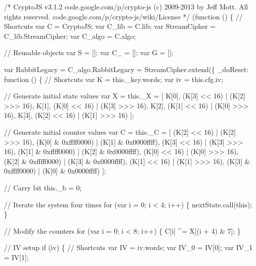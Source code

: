\begin{DoxyCodeInclude}
\textcolor{comment}{/*}
\textcolor{comment}{CryptoJS v3.1.2}
\textcolor{comment}{code.google.com/p/crypto-js}
\textcolor{comment}{(c) 2009-2013 by Jeff Mott. All rights reserved.}
\textcolor{comment}{code.google.com/p/crypto-js/wiki/License}
\textcolor{comment}{*/}
(\textcolor{keyword}{function} () \{
    \textcolor{comment}{// Shortcuts}
    var C = CryptoJS;
    var C\_lib = C.lib;
    var StreamCipher = C\_lib.StreamCipher;
    var C\_algo = C.algo;

    \textcolor{comment}{// Reusable objects}
    var S  = [];
    var C\_ = [];
    var G  = [];

    var RabbitLegacy = C\_algo.RabbitLegacy = StreamCipher.extend(\{
        \_doReset: \textcolor{keyword}{function} () \{
            \textcolor{comment}{// Shortcuts}
            var K = this.\_key.words;
            var iv = this.cfg.iv;

            \textcolor{comment}{// Generate initial state values}
            var X = this.\_X = [
                K[0], (K[3] << 16) | (K[2] >>> 16),
                K[1], (K[0] << 16) | (K[3] >>> 16),
                K[2], (K[1] << 16) | (K[0] >>> 16),
                K[3], (K[2] << 16) | (K[1] >>> 16)
            ];

            \textcolor{comment}{// Generate initial counter values}
            var C = this.\_C = [
                (K[2] << 16) | (K[2] >>> 16), (K[0] & 0xffff0000) | (K[1] & 0x0000ffff),
                (K[3] << 16) | (K[3] >>> 16), (K[1] & 0xffff0000) | (K[2] & 0x0000ffff),
                (K[0] << 16) | (K[0] >>> 16), (K[2] & 0xffff0000) | (K[3] & 0x0000ffff),
                (K[1] << 16) | (K[1] >>> 16), (K[3] & 0xffff0000) | (K[0] & 0x0000ffff)
            ];

            \textcolor{comment}{// Carry bit}
            this.\_b = 0;

            \textcolor{comment}{// Iterate the system four times}
            \textcolor{keywordflow}{for} (var i = 0; i < 4; i++) \{
                nextState.call(\textcolor{keyword}{this});
            \}

            \textcolor{comment}{// Modify the counters}
            \textcolor{keywordflow}{for} (var i = 0; i < 8; i++) \{
                C[i] ^= X[(i + 4) & 7];
            \}

            \textcolor{comment}{// IV setup}
            \textcolor{keywordflow}{if} (iv) \{
                \textcolor{comment}{// Shortcuts}
                var IV = iv.words;
                var IV\_0 = IV[0];
                var IV\_1 = IV[1];


\end{DoxyCodeInclude}
